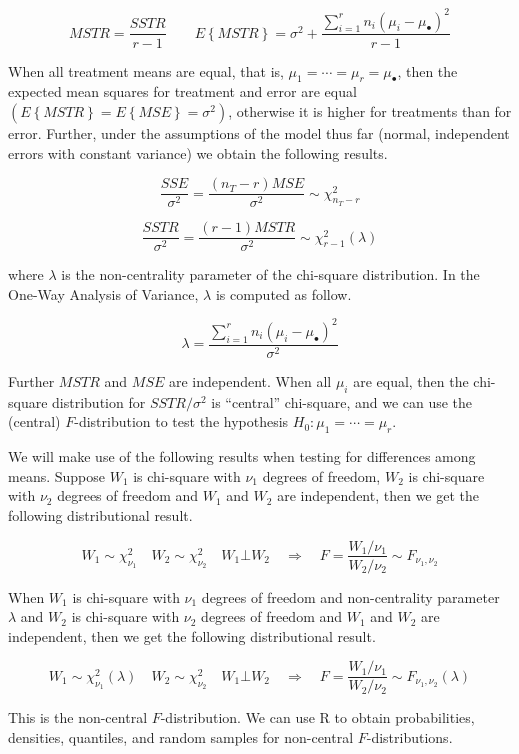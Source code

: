 \documentclass[
]{book}
\begin{document}
\[ 
MSTR = \frac{SSTR}{r-1} \qquad 
E\left\{MSTR\right\} = \sigma^2 + \frac{\sum_{i=1}^rn_i\left(\mu_i-\mu_{\bullet}\right)^2}{r-1}
\]

When all treatment means are equal, that is,
\(\mu_1=\cdots=\mu_r=\mu_{\bullet}\), then the expected mean squares for
treatment and error are equal
\(\left(E\left\{MSTR\right\} = E\left\{MSE\right\}=\sigma^2\right)\),
otherwise it is higher for treatments than for error. Further, under the
assumptions of the model thus far (normal, independent errors with
constant variance) we obtain the following results.

\[
\frac{SSE}{\sigma^2}=\frac{\left(n_T-r\right)MSE}{\sigma^2} \sim \chi_{n_T-r}^2
\]

\[
\frac{SSTR}{\sigma^2}=\frac{(r-1)MSTR}{\sigma^2} \sim \chi_{r-1}^2(\lambda)
\]

where \(\lambda\) is the non-centrality parameter of the chi-square
distribution. In the One-Way Analysis of Variance, \(\lambda\) is
computed as follow.

\[
\lambda = \frac{\sum_{i=1}^rn_i\left(\mu_i-\mu_{\bullet}\right)^2}{\sigma^2}
\]

Further \(MSTR\) and \(MSE\) are independent. When all \(\mu_i\) are
equal, then the chi-square distribution for \(SSTR/\sigma^2\) is
``central'' chi-square, and we can use the (central) \(F\)-distribution
to test the hypothesis \(H_0:\mu_1=\cdots = \mu_r\).

We will make use of the following results when testing for differences
among means. Suppose \(W_1\) is chi-square with \(\nu_1\) degrees of
freedom, \(W_2\) is chi-square with \(\nu_2\) degrees of freedom and
\(W_1\) and \(W_2\) are independent, then we get the following
distributional result.

\[
W_1 \sim \chi_{\nu_1}^2 \quad
W_2 \sim \chi_{\nu_2}^2 \quad W_1 \bot W_2 \quad \Rightarrow \quad
F = \frac{W_1/\nu_1}{W_2/\nu_2} \sim F_{\nu_1,\nu_2}
\]

When \(W_1\) is chi-square with \(\nu_1\) degrees of freedom and
non-centrality parameter \(\lambda\) and \(W_2\) is chi-square with
\(\nu_2\) degrees of freedom and \(W_1\) and \(W_2\) are independent,
then we get the following distributional result.

\[
W_1 \sim \chi_{\nu_1}^2(\lambda) \quad
W_2 \sim \chi_{\nu_2}^2 \quad W_1 \bot W_2 \quad \Rightarrow \quad
F = \frac{W_1/\nu_1}{W_2/\nu_2} \sim F_{\nu_1,\nu_2}(\lambda)
\]

This is the non-central \(F\)-distribution. We can use R to obtain
probabilities, densities, quantiles, and random samples for non-central
\(F\)-distributions.
\end{document}
